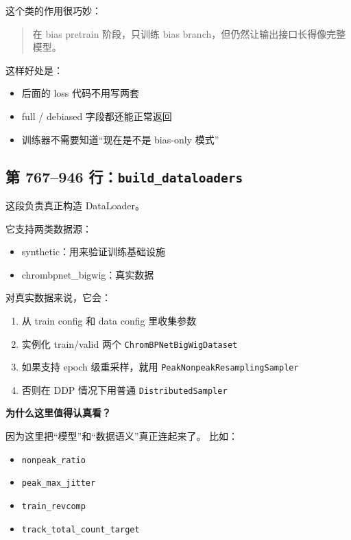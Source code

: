 \documentclass[11pt,a4paper]{ctexart}
\begin{document}
这个类的作用很巧妙：

\begin{quote}
在 bias pretrain 阶段，只训练 bias branch，但仍然让输出接口长得像完整模型。
\end{quote}

这样好处是：

\begin{itemize}[leftmargin=2em]
\item 后面的 loss 代码不用写两套
\item full / debiased 字段都还能正常返回
\item 训练器不需要知道“现在是不是 bias-only 模式”
\end{itemize}

\subsection{第 767--946 行：\texttt{build\_dataloaders}}

这段负责真正构造 DataLoader。

它支持两类数据源：

\begin{itemize}[leftmargin=2em]
\item synthetic：用来验证训练基础设施
\item chrombpnet\_bigwig：真实数据
\end{itemize}

对真实数据来说，它会：

\begin{enumerate}[leftmargin=2em]
\item 从 train config 和 data config 里收集参数
\item 实例化 train/valid 两个 \texttt{ChromBPNetBigWigDataset}
\item 如果支持 epoch 级重采样，就用 \texttt{PeakNonpeakResamplingSampler}
\item 否则在 DDP 情况下用普通 \texttt{DistributedSampler}
\end{enumerate}

\textbf{为什么这里值得认真看？}

因为这里把“模型”和“数据语义”真正连起来了。
比如：

\begin{itemize}[leftmargin=2em]
\item \texttt{nonpeak\_ratio}
\item \texttt{peak\_max\_jitter}
\item \texttt{train\_revcomp}
\item \texttt{track\_total\_count\_target}
\end{itemize}
\end{document}
